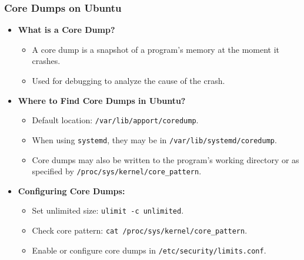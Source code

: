\begin{frame}
\frametitle{Core Dumps on Ubuntu}

\begin{itemize}
    \item \textbf{What is a Core Dump?}
    \begin{itemize}
        \item A core dump is a snapshot of a program's memory at the moment it crashes.
        \item Used for debugging to analyze the cause of the crash.
    \end{itemize}

    \item \textbf{Where to Find Core Dumps in Ubuntu?}
    \begin{itemize}
        \item Default location: \texttt{/var/lib/apport/coredump}.
        \item When using \texttt{systemd}, they may be in \texttt{/var/lib/systemd/coredump}.
        \item Core dumps may also be written to the program's working directory or as specified by \texttt{/proc/sys/kernel/core\_pattern}.
    \end{itemize}

    \item \textbf{Configuring Core Dumps:}
    \begin{itemize}
        \item Set unlimited size: \texttt{ulimit -c unlimited}.
        \item Check core pattern: \texttt{cat /proc/sys/kernel/core\_pattern}.
        \item Enable or configure core dumps in \texttt{/etc/security/limits.conf}.
    \end{itemize}
\end{itemize}

\end{frame}

